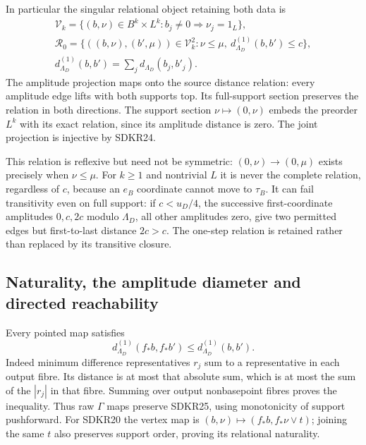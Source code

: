 In particular the singular relational object retaining
both data is
\begin{equation}\tag{SDKR27}
\begin{gathered}
\mathcal V_k=\{(b,\nu)\in B^k\times L^k:
                              b_j\ne0\Rightarrow\nu_j=1_L\},\\
\mathcal R_0=\{((b,\nu),(b',\mu))\in\mathcal V_k^2:
                     \nu\le\mu,\
                     d_{\Lambda_D}^{(1)}(b,b')\le c\},\\
d_{\Lambda_D}^{(1)}(b,b')=\sum_jd_{\Lambda_D}(b_j,b'_j).
\end{gathered}
\end{equation}
The amplitude projection maps onto the source distance
relation: every amplitude edge lifts with both supports
top. Its full-support section preserves the relation
in both directions. The support section
$\nu\mapsto(0,\nu)$ embeds the preorder $L^k$ with its
exact relation, since its amplitude distance is zero.
The joint projection is injective by SDKR24.

This relation is reflexive but need not be symmetric:
$(0,\nu)\to(0,\mu)$ exists precisely when $\nu\le\mu$.
For $k\ge1$ and nontrivial $L$ it is never the complete
relation, regardless of $c$, because an $e_B$ coordinate
cannot move to $\tau_B$. It can fail transitivity even
on full support: if $c<u_D/4$, the successive first-coordinate
amplitudes $0,c,2c$ modulo $\Lambda_D$, all other amplitudes
zero, give two permitted edges but first-to-last distance
$2c>c$. The one-step relation is retained rather than
replaced by its transitive closure.

\subsection{Naturality, the amplitude diameter and directed reachability}

Every pointed map satisfies
\begin{equation}\tag{SDKR28}
d_{\Lambda_D}^{(1)}(f_*b,f_*b')
   \le d_{\Lambda_D}^{(1)}(b,b').
\end{equation}
Indeed minimum difference representatives $r_j$ sum to
a representative in each output fibre. Its distance is
at most that absolute sum, which is at most the sum
of the $|r_j|$ in that fibre. Summing over output
nonbasepoint fibres proves the inequality. Thus raw
$\Gamma$ maps preserve SDKR25, using monotonicity of
support pushforward. For SDKR20 the vertex map is
$(b,\nu)\mapsto(f_*b,f_*\nu\vee t)$; joining the same
$t$ also preserves support order, proving its relational
naturality.

